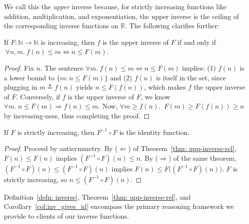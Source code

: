 We call this the \emph{upper} inverse because, for strictly increasing functions like
addition, multiplication, and exponentiation, the upper inverse is the ceiling of the
corresponding inverse functions on $\mathbb{R}$. The following clarifies further:
\begin{thm} \label{thm: upp-inverse-rel}
	If $F:\mathbb{N}\to \mathbb{N}$ is increasing, then $f$ is the upper inverse of $F$ if and only if $\ \forall n, m.~ f(n)\le m \iff n \le F(m)$.
\end{thm}
\begin{proof}
Fix $n$. The sentence $\forall m.~ f(n)\le m \iff n\le F(m)$ implies: (1) $f(n)$ is a lower bound to $\{m: n \le F(m)\}$ and (2) $f(n)$ is itself in the set, since plugging in $m \triangleq f(n)$ yields $n\le F(f(n))$, which makes $f$ the upper inverse of $F$. Conversely, if $f$ is the upper inverse of $F$, we know $\forall m.~n\le F(m)\Rightarrow f(n)\le m$. Now, $\forall m \ge f(n)$.~$F(m)\ge F(f(n)) \ge n$ by increasing-ness, thus completing the proof.
\end{proof}
\begin{col}\label{col:inv_gives_id}
If $F$ is strictly increasing, then $F^{-1} \circ F$ is
the identity function.
\end{col}
\begin{proof}
Proceed by antisymmetry. By ($\Leftarrow$) of Theorem~\ref{thm: upp-inverse-rel}, $F(n) \le F(n)$ implies
$(F^{-1} \circ F)(n) \le n$.  By ($\Rightarrow$) of the same theorem, $(F^{-1} \circ F)(n) \le (F^{-1} \circ F)(n)$ implies $F(n) \le F \big((F^{-1} \circ F)(n)\big)$. $F$ is strictly increasing, so $n \le (F^{-1} \circ F)(n)$.
\end{proof}

\begin{rem}
Definition~\ref{defn: inverse}, Theorem~\ref{thm: upp-inverse-rel}, and Corollary~\ref{col:inv_gives_id}
encompass the primary reasoning framework we provide to clients of our inverse functions.
\end{rem}

